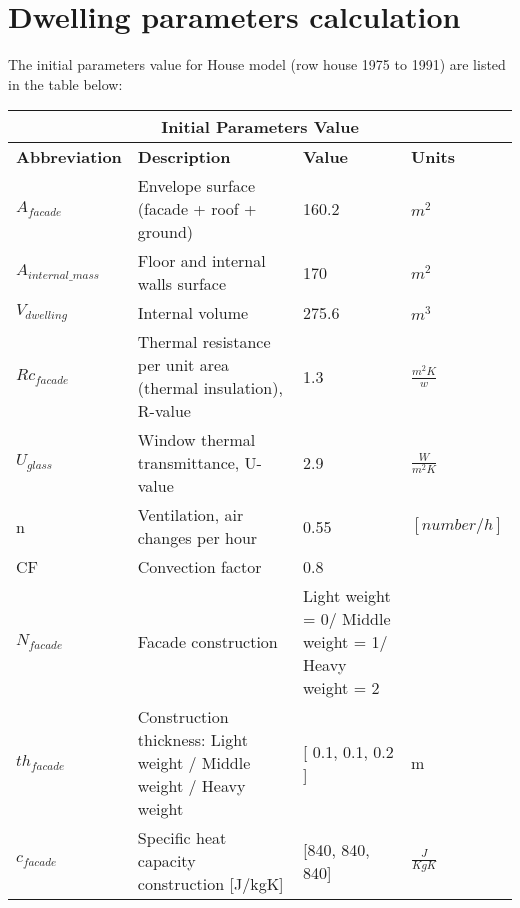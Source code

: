 \appendix
\section{Dwelling parameters calculation}
The initial parameters value for House model (row house 1975 to 1991) are listed in the table below\cite{VOORBEELD}:


\begin{table}[H]
    \centering
    
\begin{tabular}{|p{3cm}||p{7cm}||p{3cm}||p{3cm}|}
 \hline
 \multicolumn{4}{|c|}{Initial Parameters Value} \\
 \hline
\textbf{Abbreviation} & \textbf{Description} & \textbf{Value} & \textbf{Units}\\
 \hline
 
$A_{facade}$ & Envelope surface (facade + roof + ground)   & 160.2 &  $m^2$\\
 \hline

$A_{internal{\_}mass}$ & Floor and internal walls surface    & 170 & $m^2$\\
 \hline

 $V_{dwelling}$ & Internal volume & 275.6 &$m^3$\\
  \hline

 $Rc_{facade}$ & Thermal resistance per unit area (thermal insulation), R-value & 1.3 &  $\frac{m^2K}{w}$\\
  \hline

 $U_{glass}$& Window thermal transmittance, U-value & 2.9 &$\frac{W}{m^2K}$\\
 \hline

n & Ventilation, air changes per hour  & 0.55 & $[number/h]$\\

\hline

 CF& Convection factor & 0.8 &\\
 \hline
 
 $N_{facade}$ &Facade construction & Light weight = 0/ Middle weight = 1/ Heavy weight = 2 &  \\
 \hline
 
  $th_{facade}$& Construction thickness: Light weight / Middle weight / Heavy weight  & [ 0.1,  0.1, 0.2 ] & m \\
 \hline
  
 $c_{facade}$& Specific heat capacity construction [J/kgK] & [840, 840, 840] &$\frac{J}{KgK}$\\
 \hline
 

\end{tabular}
\end{table}
